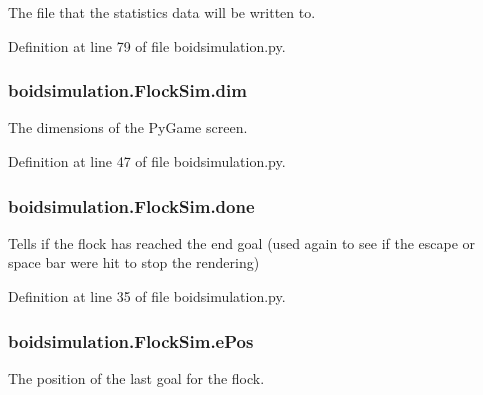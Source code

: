 The file that the statistics data will be written to. 



Definition at line 79 of file boidsimulation.\-py.

\hypertarget{classboidsimulation_1_1FlockSim_a2ba5ffd4d4ef009af8735d838eaf59d3}{
\subsubsection[{dim}]{\setlength{\rightskip}{0pt plus 5cm}boidsimulation.\-Flock\-Sim.\-dim}}\label{classboidsimulation_1_1FlockSim_a2ba5ffd4d4ef009af8735d838eaf59d3}


The dimensions of the Py\-Game screen. 



Definition at line 47 of file boidsimulation.\-py.

\hypertarget{classboidsimulation_1_1FlockSim_a970e9fcbc5d69b3987f226af5249038a}{
\subsubsection[{done}]{\setlength{\rightskip}{0pt plus 5cm}boidsimulation.\-Flock\-Sim.\-done}}\label{classboidsimulation_1_1FlockSim_a970e9fcbc5d69b3987f226af5249038a}


Tells if the flock has reached the end goal (used again to see if the escape or space bar were hit to stop the rendering) 



Definition at line 35 of file boidsimulation.\-py.

\hypertarget{classboidsimulation_1_1FlockSim_acb064f74364917a97ca9d3accdf96f45}{
\subsubsection[{e\-Pos}]{\setlength{\rightskip}{0pt plus 5cm}boidsimulation.\-Flock\-Sim.\-e\-Pos}}\label{classboidsimulation_1_1FlockSim_acb064f74364917a97ca9d3accdf96f45}


The position of the last goal for the flock. 



